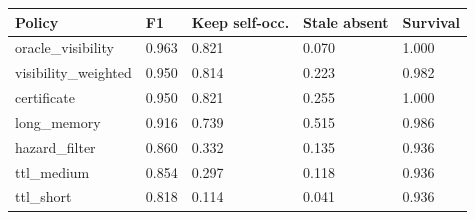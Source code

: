 \begin{tabular}{lllll}
\toprule
Policy & F1 & Keep self-occ. & Stale absent & Survival \\
\midrule
oracle\_visibility & 0.963 & 0.821 & 0.070 & 1.000 \\
visibility\_weighted & 0.950 & 0.814 & 0.223 & 0.982 \\
certificate & 0.950 & 0.821 & 0.255 & 1.000 \\
long\_memory & 0.916 & 0.739 & 0.515 & 0.986 \\
hazard\_filter & 0.860 & 0.332 & 0.135 & 0.936 \\
ttl\_medium & 0.854 & 0.297 & 0.118 & 0.936 \\
ttl\_short & 0.818 & 0.114 & 0.041 & 0.936 \\
\bottomrule
\end{tabular}
